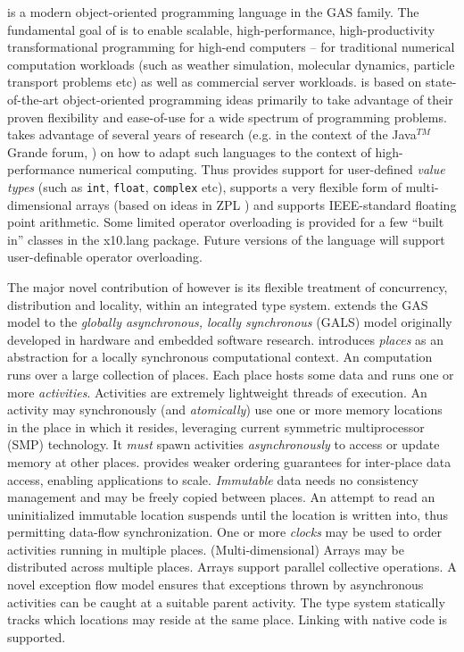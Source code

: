 \Xten{} is a modern object-oriented programming language
in the GAS family. The fundamental goal of \Xten{} is to enable
scalable, high-performance, high-productivity transformational
programming for high-end computers -- for traditional numerical
computation workloads (such as weather simulation, molecular dynamics,
particle transport problems etc) as well as commercial server
workloads.
\Xten{} is based on state-of-the-art object-oriented
programming ideas primarily to take advantage of their proven
flexibility and ease-of-use for a wide spectrum of programming
problems. \Xten{} takes advantage of several years of research (e.g.{}
in the context of the Java$^{TM}$ Grande forum,
\cite{moreira00java,kava}) on how to adapt such languages to the context of
high-performance numerical computing. Thus \Xten{} provides support
for user-defined {\em value types} (such as {\tt int}, {\tt float},
{\tt complex} etc), supports a very
flexible form of multi-dimensional arrays (based on ideas in ZPL
\cite{zpl}) and supports IEEE-standard floating point arithmetic.
Some limited operator overloading is provided for a few ``built in''
classes in the {\cf x10.lang} package.  Future versions of the
language will support user-definable operator overloading.

The major novel contribution of \Xten{} however is its flexible
treatment of concurrency, distribution and locality, within an
integrated type system. \Xten{} extends the GAS model to the {\em
globally asynchronous, locally synchronous} (GALS) model originally
developed in hardware and embedded software research.  {}\Xten{}
introduces {\em places} as an abstraction for a locally synchronous
computational context. An \Xten{} computation runs over a large
collection of places.  Each place hosts some data and runs one or more
{\em activities}. Activities are extremely lightweight threads of
execution. An activity may synchronously (and {\em atomically}) use
one or more memory locations in the place in which it resides,
leveraging current symmetric multiprocessor (SMP) technology.  It {\em
must} spawn activities {\em asynchronously} to access or update memory
at other places. \Xten{} provides weaker ordering guarantees for
inter-place data access, enabling applications to scale.  {\em
Immutable} data needs no consistency management and may be freely
copied between places.  An attempt to read an uninitialized immutable
location suspends until the location is written into, thus permitting
data-flow synchronization. One or more {\em clocks} may be used to
order activities running in multiple places. (Multi-dimensional)
Arrays may be distributed across multiple places. Arrays support
parallel collective operations. A novel exception flow model ensures
that exceptions thrown by asynchronous activities can be caught at a
suitable parent activity.  The type system statically tracks which
locations may reside at the same place.  Linking with native code is
supported.

